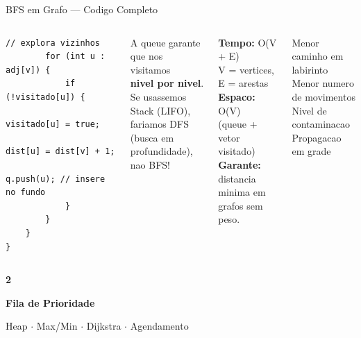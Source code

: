 \documentclass[aspectratio=169,11pt]{beamer}
\begin{document}
\begin{frame}[fragile,shrink=8]{BFS em Grafo --- Codigo Completo}
\begin{columns}[t]
\begin{tcolorbox}[caixaCodigo]
\begin{lstlisting}[style=cppsmall]
        // explora vizinhos
        for (int u : adj[v]) {
            if (!visitado[u]) {
                visitado[u] = true;
                dist[u] = dist[v] + 1;
                q.push(u); // insere no fundo
            }
        }
    }
}
        \end{lstlisting}
      \end{tcolorbox}
      \vspace{0.1cm}
      \begin{tcolorbox}[caixaAzul,title={Por que Queue?}]
        \footnotesize
        A queue garante que nos visitamos\\
        \textbf{nivel por nivel}.\\[4pt]
        Se usassemos Stack (LIFO),\\
        fariamos DFS (busca em\\
        profundidade), nao BFS!
      \end{tcolorbox}
      \vspace{0.2cm}
      \begin{tcolorbox}[caixaVerde,title={Complexidade BFS}]
        \footnotesize
        \textbf{Tempo:} O(V + E)\\
        V = vertices, E = arestas\\[4pt]
        \textbf{Espaco:} O(V)\\
        (queue + vetor visitado)\\[4pt]
        \textbf{Garante:} distancia\\
        minima em grafos sem peso.
      \end{tcolorbox}
      \vspace{0.2cm}
      \begin{tcolorbox}[caixaAmarelo,title={Aplicacoes na OBI}]
        \footnotesize
        Menor caminho em labirinto\\
        Menor numero de movimentos\\
        Nivel de contaminacao\\
        Propagacao em grade
      \end{tcolorbox}
  \end{columns}
\end{frame}

{
\begin{frame}[noframenumbering]
  \centering\vspace{1.2cm}
  {\fontsize{40}{48}\selectfont\bfseries\color{gemaBlue} 2}\par
  \vspace{0.3cm}
  {\Large\color{pqColor}\bfseries Fila de Prioridade}\par
  \vspace{0.2cm}
  {\color{gray}\small Heap $\cdot$ Max/Min $\cdot$ Dijkstra $\cdot$ Agendamento}
\end{frame}
}
\end{document}
